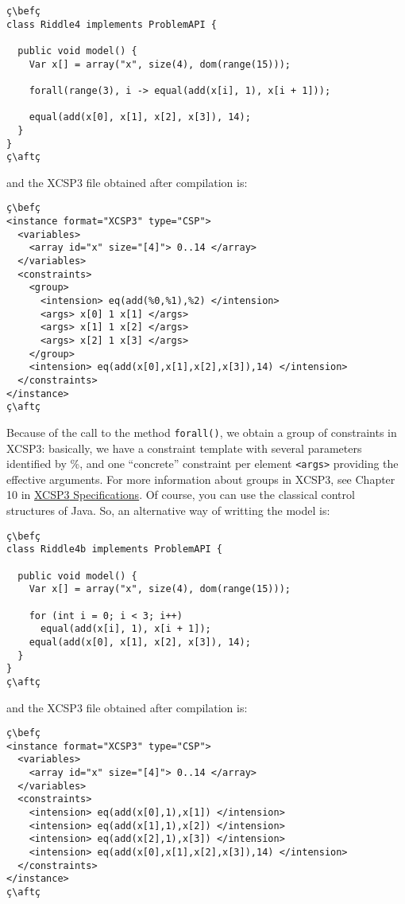 \documentclass[10pt]{article}
\def\xt{{\rm XCSP3}\xspace}
\newcommand{\xml}[1]{{\tt <#1>}} %
\newcommand{\nn}[1]{{\tt #1}} %
\def\xt{{\rm XCSP3}\xspace}
\def\bef{\rule{10cm}{0.1mm}} %
\def\aft{\rule{10cm}{0.1mm}\medskip}
\begin{document}
\begin{lstlisting}
ç\befç
class Riddle4 implements ProblemAPI {

  public void model() {
    Var x[] = array("x", size(4), dom(range(15)));
    
    forall(range(3), i -> equal(add(x[i], 1), x[i + 1]));

    equal(add(x[0], x[1], x[2], x[3]), 14);
  }
}
ç\aftç
\end{lstlisting}
and the \xt file obtained after compilation is:
\begin{lstlisting}
ç\befç
<instance format="XCSP3" type="CSP">
  <variables>
    <array id="x" size="[4]"> 0..14 </array>
  </variables>
  <constraints>
    <group>
      <intension> eq(add(%0,%1),%2) </intension>
      <args> x[0] 1 x[1] </args>
      <args> x[1] 1 x[2] </args>
      <args> x[2] 1 x[3] </args>
    </group>
    <intension> eq(add(x[0],x[1],x[2],x[3]),14) </intension>
  </constraints>
</instance>
ç\aftç
\end{lstlisting}

Because of the call to the method \nn{forall()}, we obtain a group of constraints in \xt: basically, we have a constraint template with several parameters identified by \%,
and one ``concrete'' constraint per element \xml{args} providing the effective arguments.
For more information about groups in \xt, see Chapter 10 in \href{http://www.xcsp.org/format3.pdf}{\xt Specifications}.
Of course, you can use the classical control structures of Java. So, an alternative way of writting the model is:
\begin{lstlisting}
ç\befç
class Riddle4b implements ProblemAPI {

  public void model() {
    Var x[] = array("x", size(4), dom(range(15)));
    
    for (int i = 0; i < 3; i++)
      equal(add(x[i], 1), x[i + 1]);
    equal(add(x[0], x[1], x[2], x[3]), 14);
  }
}
ç\aftç
\end{lstlisting}
and the \xt file obtained after compilation is:
\begin{lstlisting}
ç\befç
<instance format="XCSP3" type="CSP">
  <variables>
    <array id="x" size="[4]"> 0..14 </array>
  </variables>
  <constraints>
    <intension> eq(add(x[0],1),x[1]) </intension>
    <intension> eq(add(x[1],1),x[2]) </intension>
    <intension> eq(add(x[2],1),x[3]) </intension>
    <intension> eq(add(x[0],x[1],x[2],x[3]),14) </intension>
  </constraints>
</instance>
ç\aftç
\end{lstlisting}
\end{document}
